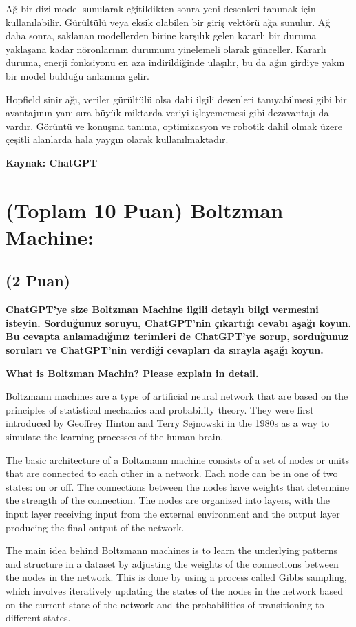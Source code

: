 \documentclass[11pt]{article}
\begin{document}
Ağ bir dizi model sunularak eğitildikten sonra yeni desenleri tanımak için kullanılabilir. Gürültülü veya eksik olabilen bir giriş vektörü ağa sunulur. Ağ daha sonra, saklanan modellerden birine karşılık gelen kararlı bir duruma yaklaşana kadar nöronlarının durumunu yinelemeli olarak günceller. Kararlı duruma, enerji fonksiyonu en aza indirildiğinde ulaşılır, bu da ağın girdiye yakın bir model bulduğu anlamına gelir.

Hopfield sinir ağı, veriler gürültülü olsa dahi ilgili desenleri tanıyabilmesi gibi bir avantajının yanı sıra büyük miktarda veriyi işleyememesi gibi dezavantajı da vardır. Görüntü ve konuşma tanıma, optimizasyon ve robotik dahil olmak üzere çeşitli alanlarda hala yaygın olarak kullanılmaktadır.

\textbf{Kaynak: ChatGPT}


\section{(Toplam 10 Puan) Boltzman Machine:}

\subsection{(2 Puan)} \textbf{ChatGPT’ye size Boltzman Machine ilgili detaylı bilgi vermesini isteyin. Sorduğunuz soruyu, ChatGPT'nin çıkartığı cevabı aşağı koyun. Bu cevapta anlamadığınız terimleri de ChatGPT’ye sorup, sorduğunuz soruları ve ChatGPT’nin verdiği cevapları da sırayla aşağı koyun.}

\textbf{What is Boltzman Machin? Please explain in detail.}

Boltzmann machines are a type of artificial neural network that are based on the principles of statistical mechanics and probability theory. They were first introduced by Geoffrey Hinton and Terry Sejnowski in the 1980s as a way to simulate the learning processes of the human brain.

The basic architecture of a Boltzmann machine consists of a set of nodes or units that are connected to each other in a network. Each node can be in one of two states: on or off. The connections between the nodes have weights that determine the strength of the connection. The nodes are organized into layers, with the input layer receiving input from the external environment and the output layer producing the final output of the network.

The main idea behind Boltzmann machines is to learn the underlying patterns and structure in a dataset by adjusting the weights of the connections between the nodes in the network. This is done by using a process called Gibbs sampling, which involves iteratively updating the states of the nodes in the network based on the current state of the network and the probabilities of transitioning to different states.
\end{document}
